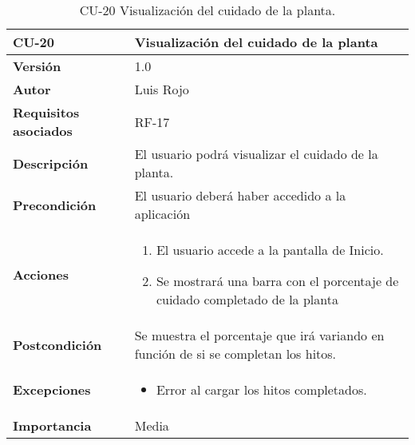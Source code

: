 \begin{table}[p]
	\centering
	\begin{tabularx}{\linewidth}{ p{} p{} }
		\toprule
		\textbf{CU-20}    & \textbf{Visualización del cuidado de la planta}\\
		\toprule
		\textbf{Versión}              & 1.0    \\
		\textbf{Autor}                & Luis Rojo \\
		\textbf{Requisitos asociados} & RF-17 \\
		\textbf{Descripción}          & El usuario podrá visualizar el cuidado de la planta. \\
		\textbf{Precondición}         &  El usuario deberá haber accedido a la aplicación \\
		\textbf{Acciones}             &
		\begin{enumerate}
			\def\labelenumi{\arabic{enumi}.}
			\tightlist
			\item El usuario accede a la pantalla de Inicio.
                \item Se mostrará una barra con el porcentaje de cuidado completado de la planta
		\end{enumerate}\\
		\textbf{Postcondición}        & Se muestra el porcentaje que irá variando en función de si se completan los hitos.  \\
		\textbf{Excepciones}          &  
            \begin{itemize}
                \item Error al cargar los hitos completados.
            \end{itemize}
           \\
		\textbf{Importancia}          & Media  \\
		\bottomrule
	\end{tabularx}
	\caption{CU-20 Visualización del cuidado de la planta.}
\end{table}

